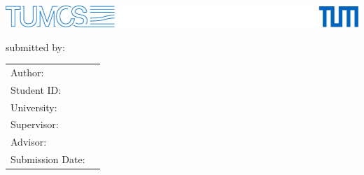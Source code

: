 \begin{titlepage}
  \centering
  \includegraphics[width = \textwidth]{logos/test.pdf}

  \vspace{50mm}

  {\LARGE \getDoctype{}}

  \vspace{15mm}
  \makeatletter
  {\LARGE\bfseries \getTitle{}}


  \vspace{25mm}
  {\Large submitted by:}

  \vspace{1mm}
  {\Large \text{\getAuthor{}}}


  \vfill
  \begin{tabular}{l l}
    Author:          & \getAuthor{} \\
    Student ID:   & \getMatrNr{} \\
    University:     & \getUniversity{} \\
    Supervisor:      & \getSupervisor{} \\
    Advisor:         & \getAdvisor{} \\
    Submission Date: & \getSubmissionDate{} \\
  \end{tabular}

\end{titlepage}

